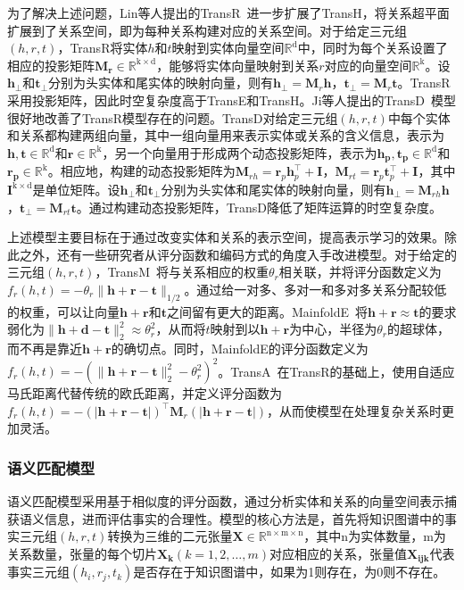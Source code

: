 \documentclass[algorithmlist, AutoFakeBold, AutoFakeSlant, figurelist, tablelist, nomlist, masters]{seuthesix}
\begin{document}
为了解决上述问题，Lin等人提出的TransR~\cite{lin2015learning}进一步扩展了TransH，将关系超平面扩展到了关系空间，即为每种关系构建对应的关系空间。对于给定三元组$\left(h, r, t\right)$，TransR将实体$h$和$t$映射到实体向量空间$\mathbb{R}^{\mathrm{d}}$中，同时为每个关系设置了相应的投影矩阵$\mathbf{M_r} \in \mathbb{R}^\mathrm{k \times d}$，能够将实体向量映射到关系$r$对应的向量空间$\mathbb{R}^{\mathrm{k}}$。设$\bm{h_\perp}$和$\bm{t_\perp}$分别为头实体和尾实体的映射向量，则有$\bm{h}_{\perp}=\bm{M}_r \bm{h}$，$\bm{t}_{\perp} = \bm{M}_r \bm{t}$。TransR采用投影矩阵，因此时空复杂度高于TransE和TransH。Ji等人提出的TransD~\cite{ji2015knowledge}模型很好地改善了TransR模型存在的问题。TransD对给定三元组$\left(h, r, t\right)$中每个实体和关系都构建两组向量，其中一组向量用来表示实体或关系的含义信息，表示为$\bm{h, t} \in \mathbb{R}^{\mathrm{d}}$和$\bm{r} \in \mathbb{R}^{\mathrm{k}}$，另一个向量用于形成两个动态投影矩阵，表示为$\bm{h_p, t_p} \in \mathbb{R}^{\mathrm{d}}$和$\bm{r_p} \in \mathbb{R}^{\mathrm{k}}$。相应地，构建的动态投影矩阵为$\mathbf{M}_{r h} = \bm{r}_p \bm{h}_p^{\top} + \mathbf{I}$，$\mathbf{M}_{r t}=\bm{r}_p \bm{t}_p^{\top} + \mathbf{I}$，其中$\mathbf{I}^{\mathrm{k \times d}}$是单位矩阵。设$\bm{h_\perp}$和$\bm{t_\perp}$分别为头实体和尾实体的映射向量，则有$\bm{h}_{\perp}=\mathbf{M}_{r h} \bm{h}$，$\bm{t}_{\perp}=\mathbf{M}_{r t} \bm{t}$。通过构建动态投影矩阵，TransD降低了矩阵运算的时空复杂度。

上述模型主要目标在于通过改变实体和关系的表示空间，提高表示学习的效果。除此之外，还有一些研究者从评分函数和编码方式的角度入手改进模型。对于给定的三元组$\left(h, r, t\right)$，TransM~\cite{fan2014transition}将与关系相应的权重$\theta_r$相关联，并将评分函数定义为$f_r(h, t)=-\theta_r\|\bm{h} + \bm{r} - \bm{t}\|_{1 / 2}$。通过给一对多、多对一和多对多关系分配较低的权重，可以让向量$\bm{h} + \bm{r}$和$\bm{t}$之间留有更大的距离。MainfoldE~\cite{xiao2016one}将$\bm{h} + \bm{r} \approx \bm{t}$的要求弱化为$\|\bm{h} + \bm{d} - \bm{t}\|_2^2 \approx \theta_r^2$，从而将$t$映射到以$\bm{h} + \bm{r}$为中心，半径为$\theta_r$的超球体，而不再是靠近$\bm{h} + \bm{r}$的确切点。同时，MainfoldE的评分函数定义为$f_r(h, t) = -\left(\|\bm{h} + \bm{r} - \bm{t}\|_2^2 - \theta_r^2\right)^2$。TransA~\cite{xiao2015transa}在TransR的基础上，使用自适应马氏距离代替传统的欧氏距离，并定义评分函数为$f_r(h, t) = -(|\bm{h} + \bm{r} - \bm{t}|)^{\top} \mathbf{M}_r(|\bm{h} + \bm{r} - \bm{t}|)$，从而使模型在处理复杂关系时更加灵活。

\subsubsection{语义匹配模型}
语义匹配模型采用基于相似度的评分函数，通过分析实体和关系的向量空间表示捕获语义信息，进而评估事实的合理性。模型的核心方法是，首先将知识图谱中的事实三元组$\left(h, r, t\right)$转换为三维的二元张量$\mathbf{X} \in \mathbb{R}^{\mathrm{n \times m \times n}}$，其中n为实体数量，m为关系数量，张量的每个切片$\mathbf{X_k}(k=1,2, \ldots, m)$对应相应的关系，张量值$\mathbf{X_{i j k}}$代表事实三元组$\left(h_i, r_j, t_k\right)$是否存在于知识图谱中，如果为1则存在，为0则不存在。
\end{document}
